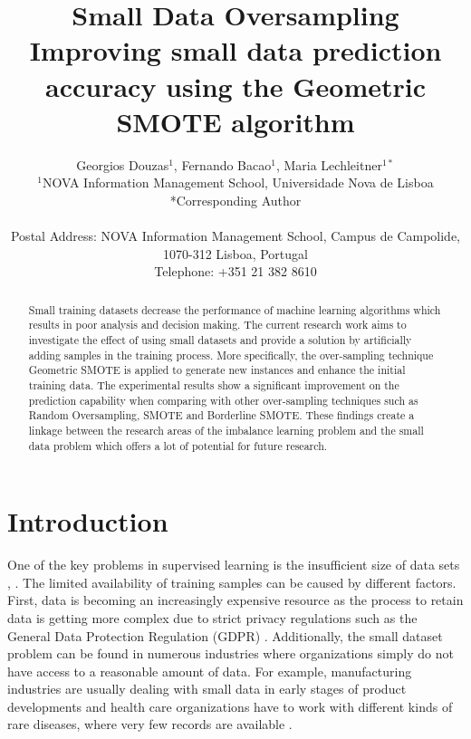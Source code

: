 \documentclass[parskip=full]{scrartcl}
\title{Small Data Oversampling  \\ \LARGE{Improving small data prediction accuracy using the Geometric SMOTE algorithm}}
\author{
	Georgios Douzas\(^{1}\), Fernando Bacao\(^{1}\), Maria Lechleitner\(^{1*}\) 
	\\
	\small{\(^{1}\)NOVA Information Management School, Universidade Nova de Lisboa}
	\\
	\small{*Corresponding Author}
	\\
	\\
	\small{Postal Address: NOVA Information Management School, Campus de Campolide, 1070-312 Lisboa, Portugal}
	\\
	\small{Telephone: +351 21 382 8610}
}
\date{}
\begin{document}
\maketitle

\begin{abstract}
Small training datasets decrease the performance of machine learning algorithms
which results in poor analysis and decision making. The current research work
aims to investigate the effect of using small datasets and provide a solution by
artificially adding samples in the training process. More specifically, the
over-sampling technique Geometric SMOTE is applied to generate new instances and
enhance the initial training data. The experimental results show a significant
improvement on the prediction capability when comparing with other over-sampling
techniques such as Random Oversampling, SMOTE and Borderline SMOTE. These
findings create a linkage between the research areas of the imbalance learning
problem and the small data problem which offers a lot of potential for future
research.
\end{abstract}

\section{Introduction}
One of the key problems in supervised learning is the insufficient size of data
sets \cite{Niyogi.1998}, \cite{AbdulLateh.2017}. The limited availability of
training samples can be caused by different factors. First, data is becoming an
increasingly expensive resource \cite{Li.2007} as the process to retain data is
getting more complex due to strict privacy regulations such as the General Data
Protection Regulation (GDPR) \cite{EuropeanCommission.2019}. Additionally, the
small dataset problem can be found in numerous industries where organizations
simply do not have access to a reasonable amount of data. For example, manufacturing 
industries are usually dealing with small data in early stages of
product developments and health care organizations have to work with different
kinds of rare diseases, where very few records are available \cite{AbdulLateh.2017}.
\end{document}
